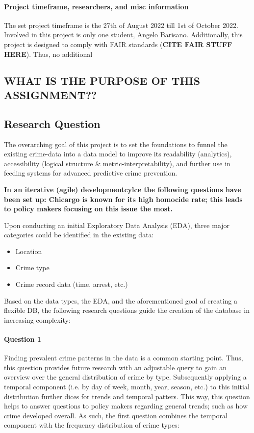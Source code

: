 \documentclass[a4paper]{article}
\begin{document}
\paragraph{Project timeframe, researchers, and misc information} The set project timeframe is the 27th of August 2022 till 1st of October 2022. Involved in this project is only one student, Angelo Barisano. Additionally, this project is designed to comply with FAIR standards (\textbf{CITE FAIR STUFF HERE}). Thus, no additional 

\subsection{WHAT IS THE PURPOSE OF THIS ASSIGNMENT??}

\subsection{Research Question}
The overarching goal of this project is to set the foundations to funnel the existing crime-data into a data model to improve its readability (analytics), accessibility (logical structure \& metric-interpretability), and further use in feeding systems for advanced predictive crime prevention. 


\textbf{In an iterative (agile) developmentcylce the following questions have been set up: Chicargo is known for its high homocide rate; this leads to policy makers focusing on this issue the most. }

Upon conducting an initial Exploratory Data Analysis (EDA), three major categories could be identified in the existing data: 

\begin{itemize}
  \item Location
  \item Crime type
  \item Crime record data (time, arrest, etc.)
\end{itemize}

Based on the data types, the EDA, and the aforementioned goal of creating a flexible DB, the following research questions guide the creation of the database in increasing complexity:

\paragraph{Question 1} Finding prevalent crime patterns in the data is a common starting point. Thus, this question provides future research with an adjustable query to gain an overview over the general distribution of crime by type. Subsequently applying a temporal component (i.e. by day of week,  month, year, season, etc.) to this initial distribution further dices for trends and temporal patters. This way, this question helps to answer questions to policy makers regarding general trends; such as how crime developed overall. As such, the first question combines the temporal component with the frequency distribution of crime types:
\end{document}

